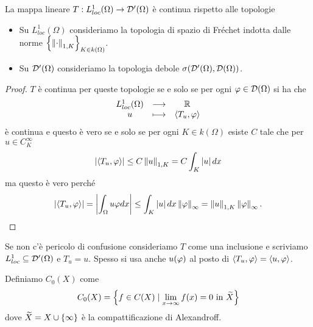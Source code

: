 \begin{exercise}
La mappa lineare $T:L^1_{loc}(\Omega)\to \mathcal{D}'(\Omega)$ \`e continua rispetto alle topologie
\begin{itemize}
    \item Su $L^1_{loc}(\Omega)$ consideriamo la topologia di spazio di Fr\'echet indotta dalle norme $\left\{{{\left\Vert{\cdot}\right\Vert}_{1,K}}\right\}_{K\in k(\Omega)}$.
    \item Su $\mathcal{D}'(\Omega)$ consideriamo la topologia debole $\sigma(\mathcal{D}'(\Omega),\mathcal{D}(\Omega))$.
\end{itemize}
\end{exercise}
\begin{proof}
$T$ \`e continua per queste topologie se e solo se per ogni $\varphi\in \mathcal{D}(\Omega)$ si ha che
\[\begin{array}{ccc} {L^1_{loc}(\Omega)} & \longrightarrow & {\mathbb{R}}\\ {u} & \longmapsto & {\left\langle {T_u,\varphi}\right\rangle} \end{array}\]
\`e continua e questo \`e vero se e solo se per ogni $K\in k(\Omega)$ esiste $C$ tale che per $u\in C^\infty_K$
\[\left|{\left\langle {T_u,\varphi}\right\rangle}\right|\leq C \left\Vert{u}\right\Vert_{1,K}=C\int_K \left|{u}\right|dx\]
ma questo \`e vero perch\'e
\[\left|{\left\langle {T_u,\varphi}\right\rangle}\right|=\left|{\int_\Omega u\varphi dx}\right|\leq \int_K\left|{u}\right|dx \left\Vert{\varphi}\right\Vert_{\infty}=\left\Vert{u}\right\Vert_{1,K}\left\Vert{\varphi}\right\Vert_\infty.\]
\end{proof}

\begin{notation}
Se non c'\`e pericolo di confusione consideriamo $T$ come una inclusione e scriviamo $L^1_{loc}\subseteq \mathcal{D}'(\Omega)$ e $T_u=u$. Spesso si usa anche $u(\varphi)$ al posto di $\left\langle {T_u,\varphi}\right\rangle=\left\langle {u,\varphi}\right\rangle$.
\end{notation}


\begin{definition}
Definiamo $C_0(X)$ come
\[C_0(X)=\left\{{f\in C(X)\mid \lim_{x\to\infty}f(x)= 0\text{ in }\widetilde{X}}\right\}\]
dove $\widetilde{X}=X\cup \left\{{\infty}\right\}$ \`e la compattificazione di Alexandroff.
\end{definition}

